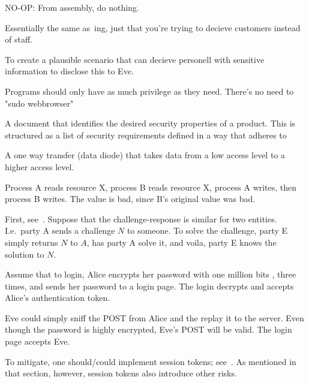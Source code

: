 \begin{definition}[No-operation]{NO-OP:}
	From assembly, do nothing. 
\end{definition}

\begin{definition}[Phishing]
	Essentially the same as~ing, just that you're trying to
	decieve customers instead of staff.
\end{definition}

\begin{definition}[Pretext]\label{pretext}
	To create a plausible scenario that can decieve personell with 
	sensitive information to disclose this to Eve.
\end{definition}

\begin{definition}
	Programs should only have as much privilege as they need.
	There's no need to "sudo webbrowser"

\end{definition}

\begin{definition}
	A document that identifies the desired security properties of a product.
	This is structured as a list of security requirements defined 
	in a way that adheres to~
\end{definition}

\begin{definition}[Pump]
	A one way transfer (data diode) that takes data from
	a low access level to a higher access level. 
\end{definition}

\begin{definition}
	Process A reads resource X, process B reads resource X,
	process A writes, then process B writes. The value is bad, since B's
	original value was bad.
\end{definition}

\begin{definition}
	First, see~.
	Suppose that the challenge-response is similar for two
	entities. I.e.\ party A sends a challenge $N$ to someone.
	To solve the challenge, party E simply returns $N$ to $A$,
	has party A solve it, and voila, party E knows the solution to $N$.
\end{definition}

\begin{definition} 
	Assume that to login, Alice encrypts her password with one million bits
	, three times, and sends her password to a login page. The login
	decrypts and accepts Alice's authentication token.

	Eve could simply sniff the POST from Alice and the replay it to the 
	server. Even though the password is highly encrypted,
	Eve's POST will be valid. The login page accepts Eve.

    To mitigate, one should/could implement session tokens;
    see~. As mentioned in that section, however, session
    tokens also introduce other risks.
\end{definition}

